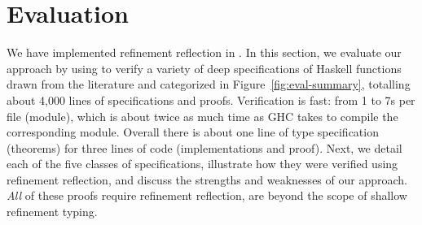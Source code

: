\section{Evaluation}\label{sec:evaluation}



\begin{figure}[t!]
\begin{minipage}[b]{0.47\textwidth}

\end{minipage}
\hspace{0.2in}
\begin{minipage}[b]{0.47\textwidth}

\end{minipage}
\end{figure}

We have implemented refinement reflection
in \toolname.
%
In this section, we evaluate our approach
by using \toolname to verify a variety of
deep specifications of Haskell functions
drawn from the literature and categorized
in Figure~\ref{fig:eval-summary},
totalling about 4,000 lines of specifications
and proofs.
%
Verification is fast: from 1 to 7s per
file (module), which is about twice as
much time as GHC takes to compile the
corresponding module.
%
Overall there is about one line of
type specification (theorems)
for three lines of code (implementations and proof).
%
Next, we detail each of the five classes of
specifications, illustrate how they were
verified using refinement reflection, and
discuss the strengths and weaknesses of
our approach.
%
\emph{All} of these proofs require refinement
reflection, \ie are beyond the scope of shallow
refinement typing.

